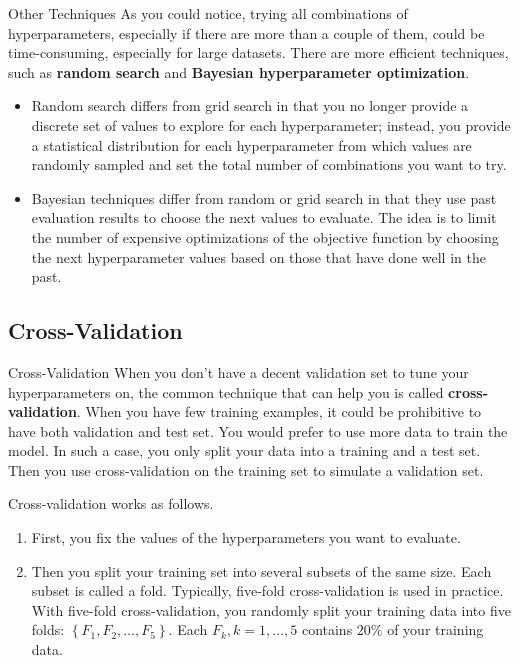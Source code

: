 \documentclass[8pt,dvipsnames]{beamer}
\begin{document}
\begin{frame}{Other Techniques}
	As you could notice, trying all combinations of hyperparameters, especially if there are more than a couple of them, could be time-consuming, especially for large datasets. There are more efficient techniques, such as \textbf{random search} and \textbf{Bayesian hyperparameter optimization}.
	\begin{itemize}
		\item Random search differs from grid search in that you no longer provide a discrete set of values to explore for each hyperparameter; instead, you provide a statistical distribution for each hyperparameter from which values are randomly sampled and set the total number of combinations you want to try.
		\item Bayesian techniques differ from random or grid search in that they use past evaluation results to choose the next values to evaluate. The idea is to limit the number of expensive optimizations of the objective function by choosing the next hyperparameter values based on those that have done well in the past.
	\end{itemize}
\end{frame}
\subsection{Cross-Validation}
\begin{frame}{Cross-Validation}
	When you don't have a decent validation set to tune your hyperparameters on, the common technique that can help you is called \textbf{cross-validation}. When you have few training examples, it could be prohibitive to have both validation and test set. You would prefer to use more data to train the model. In such a case, you only split your data into a training and a test set. Then you use cross-validation on the training set to simulate a validation set.

	Cross-validation works as follows.
	\begin{enumerate}
		\item First, you fix the values of the hyperparameters you want to evaluate.
		\item Then you split your training set into several subsets of the same size. Each subset is called a fold. Typically, five-fold cross-validation is used in practice. With five-fold cross-validation, you randomly split your training data into five folds: $\left\{F_{1}, F_{2}, \ldots, F_{5}\right\}$. Each $F_{k}, k=1, \ldots, 5$ contains $20 \%$ of your training data.
	\end{enumerate}
\end{frame}
\end{document}
